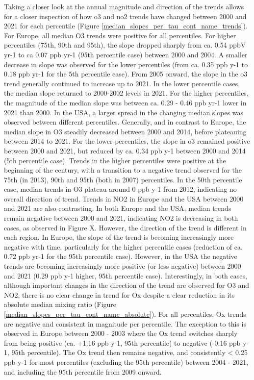 \documentclass[journal abbreviation, manuscript]{copernicus}
\begin{document}
Taking a closer look at the annual magnitude and direction of the trends allows for a closer inspection of how o3 and no2 trends have changed between 2000 and 2021 for each percentile (Figure \ref{median_slopes_per_tau_cont_name_trends}). For Europe, all median O3 trends were positive for all percentiles. For higher percentiles (75th, 90th and 95th), the slope dropped sharply from ca. 0.54 ppbV yr-1 to ca 0.07 ppb yr-1 (95th percentile case) between 2000 and 2004. A smaller decrease in slope was observed for the lower percentiles (from ca. 0.35 ppb y-1 to 0.18 ppb yr-1 for the 5th percentile case). From 2005 onward, the slope in the o3 trend generally continued to increase up to 2021. In the lower percentile cases, the median slope returned to 2000-2002 levels in 2021. For the higher percentiles, the magnitude of the median slope was between ca. 0.29 - 0.46 ppb yr-1 lower in 2021 than 2000. In the USA, a larger spread in the changing median slopes was observed between different percentiles. Generally, and in contrast to Europe, the median slope in O3 steadily decreased between 2000 and 2014, before plateauing between 2014 to 2021. For the lower percentiles, the slope in o3 remained positive between 2000 and 2021, but reduced by ca. 0.34 ppb y-1 between 2000 and 2014 (5th percentile case). Trends in the higher percentiles were positive at the beginning of the century, with a transition to a negative trend observed for the 75th (in 2013), 90th and 95th (both in 2007) percentiles. In the 50th percentile case, median trends in O3 plateau around 0 ppb y-1 from 2012, indicating no overall direction of trend. Trends in NO2 in Europe and the USA between 2000 and 2021 are also contrasting. In both Europe and the USA, median trends remain negative between 2000 and 2021, indicating NO2 is decreasing in both cases, as observed in Figure X. However, the direction of the trend is different in each region. In Europe, the slope of the trend is becoming increasingly more negative with time, particularly for the higher percentile cases (reduction of ca. 0.72 ppb yr-1 for the 95th percentile case). However, in the USA the negative trends are becoming increasingly more positive (or less negative) between 2000 and 2021 (0.29 ppb y-1 higher, 95th percentile case). Interestingly, in both cases, although important changes in the direction of the trend are observed for O3 and NO2, there is no clear change in trend for Ox despite a clear reduction in its absolute median mixing ratio (Figure \ref{median_slopes_per_tau_cont_name_absolute}). For all percentiles, Ox trends are negative and consistent in magnitude per percentile. The exception to this is observed in Europe between 2000 - 2003 where the Ox trend switches sharply from being positive (ca. +1.16 ppb y-1, 95th percentile) to negative (-0.16 ppb y-1, 95th percentile). The Ox trend then remains negative, and consistently < 0.25 ppb y-1 for most percentiles (excluding the 95th percentile) between 2004 - 2021, and including the 95th percentile from 2009 onward.
\end{document}
